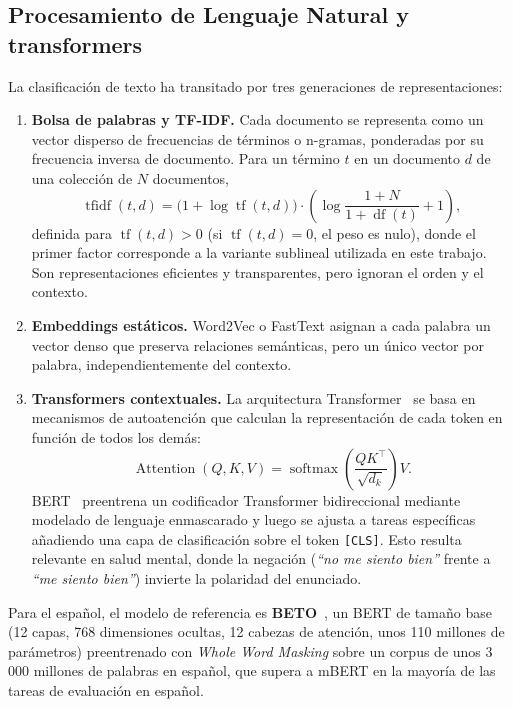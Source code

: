 \documentclass[12pt,a4paper]{article}
\begin{document}
\subsection{Procesamiento de Lenguaje Natural y transformers}
La clasificación de texto ha transitado por tres generaciones de representaciones:
\begin{enumerate}[leftmargin=2em]
    \item \textbf{Bolsa de palabras y TF-IDF.} Cada documento se representa como un vector disperso de frecuencias de términos o n-gramas, ponderadas por su frecuencia inversa de documento. Para un término $t$ en un documento $d$ de una colección de $N$ documentos,
    \begin{equation}
        \operatorname{tfidf}(t,d) = \bigl(1 + \log \operatorname{tf}(t,d)\bigr)\cdot\left(\log\frac{1+N}{1+\operatorname{df}(t)} + 1\right),
    \end{equation}
    definida para $\operatorname{tf}(t,d) > 0$ (si $\operatorname{tf}(t,d) = 0$, el peso es nulo), donde el primer factor corresponde a la variante sublineal utilizada en este trabajo. Son representaciones eficientes y transparentes, pero ignoran el orden y el contexto.
    \item \textbf{Embeddings estáticos.} Word2Vec o FastText asignan a cada palabra un vector denso que preserva relaciones semánticas, pero un único vector por palabra, independientemente del contexto.
    \item \textbf{Transformers contextuales.} La arquitectura Transformer~\cite{vaswani2017attention} se basa en mecanismos de autoatención que calculan la representación de cada token en función de todos los demás:
    \begin{equation}
        \operatorname{Attention}(Q,K,V) = \operatorname{softmax}\!\left(\frac{QK^{\top}}{\sqrt{d_k}}\right)V.
    \end{equation}
    BERT~\cite{devlin2019bert} preentrena un codificador Transformer bidireccional mediante modelado de lenguaje enmascarado y luego se ajusta a tareas específicas añadiendo una capa de clasificación sobre el token \texttt{[CLS]}. Esto resulta relevante en salud mental, donde la negación (\emph{``no me siento bien''} frente a \emph{``me siento bien''}) invierte la polaridad del enunciado.
\end{enumerate}

Para el español, el modelo de referencia es \textbf{BETO}~\cite{canete2020beto,betohf}, un BERT de tamaño base (12 capas, 768 dimensiones ocultas, 12 cabezas de atención, unos 110 millones de parámetros) preentrenado con \emph{Whole Word Masking} sobre un corpus de unos 3\,000 millones de palabras en español, que supera a mBERT en la mayoría de las tareas de evaluación en español.
\end{document}
